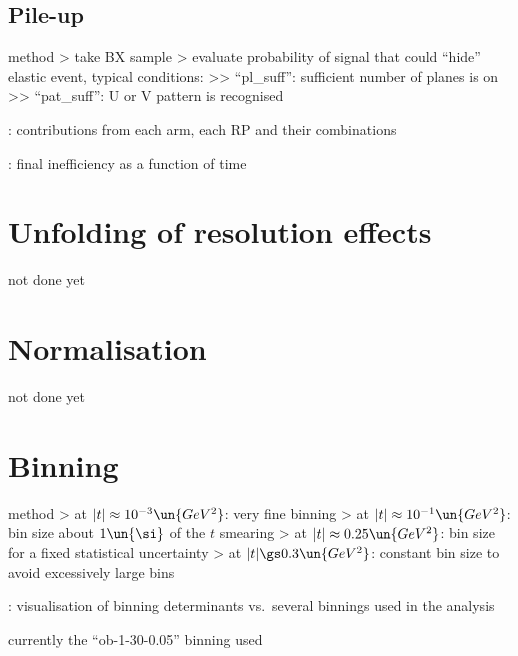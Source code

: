 \subsection{Pile-up}

\> method
\>> take BX sample
\>> evaluate probability of signal that could ``hide'' elastic event, typical conditions:
\>>> ``pl\_suff'': sufficient number of planes is on
\>>> ``pat\_suff'': U or V pattern is recognised 

\> : contributions from each arm, each RP and their combinations

\> : final inefficiency as a function of time



\section{Unfolding of resolution effects}

\> not done yet



\section{Normalisation}

\> not done yet



\section{Binning}

\> method
\>> at $|t| \approx 10^{-3}\un{GeV^2}$: very fine binning
\>> at $|t| \approx 10^{-1}\un{GeV^2}$: bin size about $1\un{\si}$ of the $t$ smearing
\>> at $|t| \approx 0.25\un{GeV^2}$: bin size for a fixed statistical uncertainty
\>> at $|t| \gs 0.3\un{GeV^2}$: constant bin size to avoid excessively large bins

\>  : visualisation of binning determinants vs.~several binnings used in
the analysis

\> currently the ``ob-1-30-0.05'' binning used



